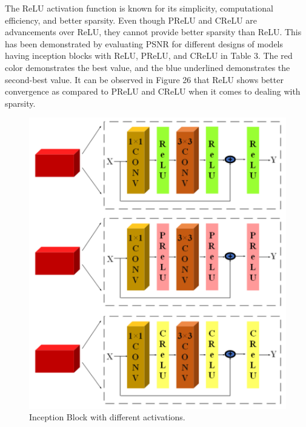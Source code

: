 \documentclass{ieeeaccess}
\begin{document}
The ReLU activation function is known for its simplicity, computational efficiency, and better sparsity. Even though PReLU and CReLU are advancements over ReLU, they cannot provide better sparsity than ReLU. This has been demonstrated by evaluating PSNR for different designs of models having inception blocks with ReLU, PReLU, and CReLU in Table 3. The red color demonstrates the best value, and the blue underlined demonstrates the second-best value. It can be observed in Figure 26 that ReLU shows better convergence as compared to PReLU and CReLU when it comes to dealing with sparsity.
\begin{figure}[H]
  \includegraphics[width=\linewidth]{25FIGURE.pdf}
  \caption{Inception Block with different activations.}
  \label{fig:25}
\end{figure}
 
\end{document}

